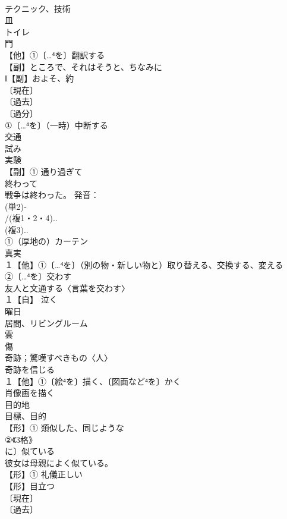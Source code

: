 \documentclass[8pt]{extreport}
\begin{document}
\begin{CJK}{UTF8}{min}
\\	テクニック、技術
\\	皿 
\\	トイレ 
\\	門 
\\	【他】①〔…⁴を〕翻訳する 
\\	【副】ところで、それはそうと、ちなみに
\\	Ⅰ【副】およそ、約
\\	〔現在〕
\\	〔過去〕
\\	〔過分〕
\\	①〔…⁴を〕（一時）中断する 
\\	交通 
\\	試み 
\\	実験 
\\	【副】① 通り過ぎて
\\	終わって 
\\	戦争は終わった。 発音：
\\	(単2)‐
\\	/(複1・2・4)..
\\	(複3)..
\\	①（厚地の）カーテン 
\\	真実 
\\	１【他】①〔…⁴を〕（別の物・新しい物と）取り替える、交換する、変える 
\\	②〔…⁴を〕交わす 
\\	友人と文通する〈言葉を交わす〉
\\	１【自】 泣く 
\\	曜日
\\	居間、リビングルーム 
\\	雲 
\\	傷 
\\	奇跡；驚嘆すべきもの〈人〉 
\\	奇跡を信じる
\\	１【他】①〔絵⁴を〕描く、〔図面など⁴を〕かく 
\\	肖像画を描く
\\	目的地 
\\	目標、目的
\\	【形】① 類似した、同じような 
\\	②《3格》
\\	に〕似ている 
\\	彼女は母親によく似ている。
\\	【形】① 礼儀正しい
\\	【形】目立つ
\\	〔現在〕
\\	〔過去〕

\end{CJK}
\end{document}
